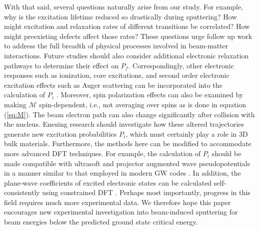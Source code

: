 \documentclass{article}
\begin{document}
With that said, %
several questions naturally arise from our study.
For example, why is the excitation lifetime reduced so drastically during
sputtering?
How might excitation and relaxation rates of different transitions be
correlated?
How might preexisting defects affect those rates?
These questions urge follow up work to address the full breadth of physical
processes involved in beam-matter interactions.
Future studies should also consider additional electronic relaxation pathways
to determine their effect on $P_f$.
Correspondingly, other electronic responses such as ionization, core
excitations, and second order electronic excitation effects such as Auger
scattering can be incorporated into the calculation of $P_i$
\cite{Lagarde2014,Kozawa2014,Nie2015,Shi2013b}.
Moreover, spin polarization effects can also be examined by making $\mathcal{M}$
spin-dependent, i.e., not averaging over spins as is done in equation
(\ref{eq:M}).
The beam electron path can also change significantly after collision with
the nucleus.
Ensuing research should investigate how these altered trajectories generate new
excitation probabilities $P_i$, which must certainly play a role in 3D bulk
materials.
Furthermore, the methods here can be modified to accommodate more advanced DFT
techniques.
For example, the calculation of $P_i$ should be made compatible with ultrasoft
and projector augmented wave pseudopotentials \cite{Blochl1994} in a manner
similar to that employed in modern GW codes \cite{Shishkin2006a, Gajdos2006,
Paier2005}.
In addition, the plane-wave coefficients of excited electronic states can be
calculated self-consistently using constrained DFT \cite{Kaduk2012}.  
Perhaps most importantly, progress in this field requires much more experimental
data.
We therefore hope this paper encourages new experimental investigation into
beam-induced sputtering for beam energies below the predicted ground state
critical energy.
\end{document}
